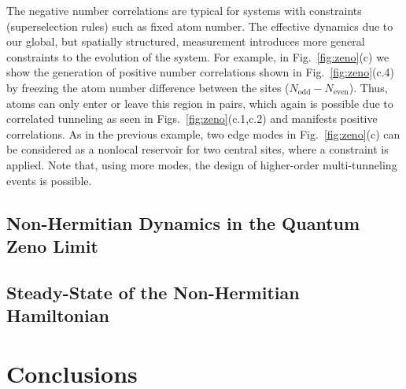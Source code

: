 The negative number correlations are typical for systems with
constraints (superselection rules) such as fixed atom number. The
effective dynamics due to our global, but spatially structured,
measurement introduces more general constraints to the evolution of
the system. For example, in Fig.~\ref{fig:zeno}(c) we show the
generation of positive number correlations shown in
Fig.~\ref{fig:zeno}(c.4) by freezing the atom number difference
between the sites ($N_\text{odd}-N_\text{even}$). Thus, atoms can only
enter or leave this region in pairs, which again is possible due to
correlated tunneling as seen in Figs.~\ref{fig:zeno}(c.1,c.2) and
manifests positive correlations. As in the previous example, two edge
modes in Fig.~\ref{fig:zeno}(c) can be considered as a nonlocal
reservoir for two central sites, where a constraint is applied. Note
that, using more modes, the design of higher-order multi-tunneling
events is possible.

\subsection{Non-Hermitian Dynamics in the Quantum Zeno Limit}


\subsection{Steady-State of the Non-Hermitian Hamiltonian}

\section{Conclusions}